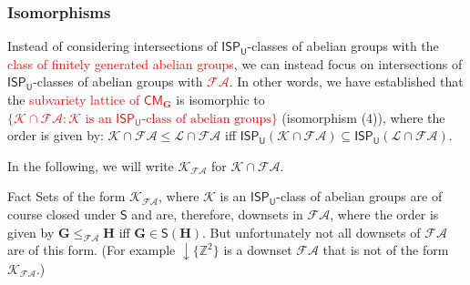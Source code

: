 \documentclass[professionalfont, handout, 10pt]{beamer} %
\theoremstyle{plain}
\theoremstyle{definition}
\newcommand{\m}[1]{{\mathbf {#1} }}
\begin{document}
\begin{frame}
\frametitle{Isomorphisms}
    Instead of considering intersections of $\mathsf{ISP_U}$-classes of abelian groups with the \textcolor{red}{class of finitely generated abelian groups}, we can instead focus on intersections of $\mathsf{ISP_U}$-classes of abelian groups with \textcolor{red}{$\mathcal{FA}$}.\pause
    In other words, we have established that the \textcolor{red}{subvariety lattice of $\mathsf{CM}_{\mathbf{G}}$} is isomorphic to \textcolor{red}{$\{\mathcal{K} \cap \mathcal{FA} : \mathcal{K} \text{ is an } \mathsf{ISP_U} \text{-class of abelian groups}\}$} (isomorphism (4)), where the order is given by: $\mathcal{K} \cap \mathcal{FA} \leq \mathcal{L} \cap \mathcal{FA}$ iff
    $\mathsf{ISP_U}(\mathcal{K} \cap \mathcal{FA}) \subseteq \mathsf{ISP_U}(\mathcal{L} \cap \mathcal{FA})$.

    In the following, we will write $\mathcal{K}_{ \mathcal{FA}}$ for $\mathcal{K} \cap \mathcal{FA}$.\pause
    \begin{block}{Fact}
        Sets of the form $\mathcal{K}_{\mathcal{FA}}$, where $\mathcal{K}$ is an $\mathsf{ISP_U}$-class of abelian groups are of course closed under $\mathsf{S}$ and are, therefore, downsets in $\mathcal{FA}$, where the order is given by $\m G \leq_{\mathcal{FA}} \m H$ iff $\m G \in \mathsf{S}(\m H)$.
        But unfortunately not all downsets of $\mathcal{FA}$ are of this form.
        (For example ${\downarrow} \{\mathbb{Z}^2\}$ is a downset $\mathcal{FA}$ that is not of the form  $\mathcal{K}_{\mathcal{FA}}$.)
    \end{block}
\end{frame}
\end{document}

